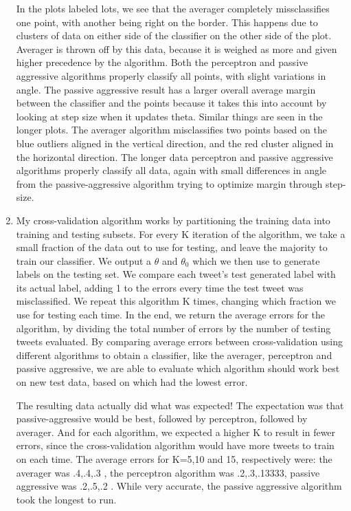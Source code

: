 \documentclass[12pt,twoside]{article}
\begin{document}
\begin{problems}
\begin{enumerate}
In the plots labeled lots, we see that the averager completely missclassifies one point, with another being right on the border. This happens due to clusters of data on either side of the classifier on the other side of the plot.  Averager is thrown off by this data, because it is weighed as more and given higher precedence by the algorithm.  Both the perceptron and passive aggressive algorithms properly classify all points, with slight variations in angle. The passive aggressive result has a larger overall average margin between the classifier and the points because it takes this into account by looking at step size when it updates theta.  Similar things are seen in the longer plots.  The averager algorithm misclassifies two points based on the blue outliers aligned in the vertical direction, and the red cluster aligned in the horizontal direction.  The longer data perceptron and passive aggressive algorithms properly classify all data, again with small differences in angle from the passive-aggressive algorithm trying to optimize margin through step-size. \\  
\problem \item
My cross-validation algorithm works by partitioning the training data into training and testing subsets.  For every K iteration of the algorithm, we take a small fraction of the data out to use for testing, and leave the majority to train our classifier. We output a $\theta$ and $\theta_0$ which we then use to generate labels on the testing set.  We compare each tweet's test generated label with its actual label, adding 1 to the errors every time the test tweet was misclassified.  We repeat this algorithm K times, changing which fraction we use for testing each time.  In the end, we return the average errors for the algorithm, by dividing the total number of errors by the number of testing tweets evaluated.  By comparing average errors between cross-validation using different algorithms to obtain a classifier, like the averager, perceptron and passive aggressive, we are able to evaluate which algorithm should work best on new test data, based on which had the lowest error. \newline

The resulting data actually did what was expected!  The expectation was that passive-aggressive would be best, followed by perceptron, followed by averager.  And for each algorithm, we expected a higher K to result in fewer errors, since the cross-validation algorithm would have more tweets to train on each time. \newline  The average errors for K=5,10 and 15, respectively were: the averager was .4,.4,.3 , the perceptron algorithm was .2,.3,.13333, passive aggressive was .2,.5,.2 .  While very accurate, the passive aggressive algorithm took the longest to run. \newline


\end{enumerate}
\end{problems}
\end{document}

